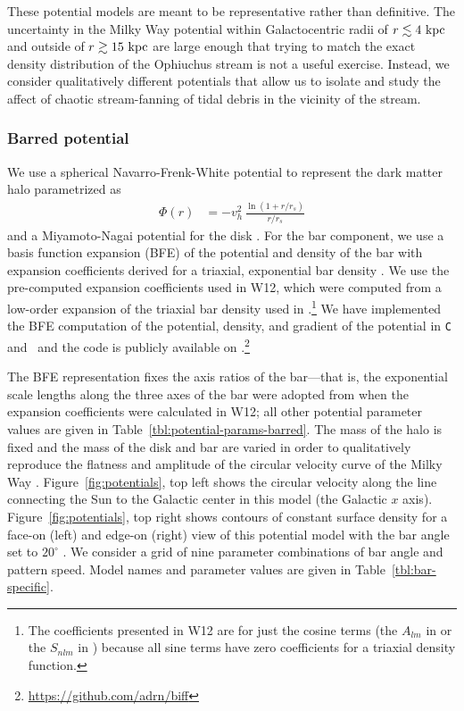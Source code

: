 \documentclass[numberedappendix]{emulateapj}
\begin{document}
These potential models are meant to be representative rather than definitive. The uncertainty in the Milky Way potential within Galactocentric radii of $r\lesssim 4~{\rm kpc}$ and outside of $r\gtrsim 15~{\rm kpc}$ are large enough that trying to match the exact density distribution of the Ophiuchus stream is not a useful exercise. Instead, we consider qualitatively different potentials that allow us to isolate and study the affect of chaotic stream-fanning of tidal debris in the vicinity of the stream. 

\subsubsection{Barred potential}
We use a spherical Navarro-Frenk-White potential to represent the dark matter halo \citep{navarro96} parametrized as
\begin{align}
	\Phi(r) &= -v_h^2\,\frac{\ln{(1 + r/r_s)}}{r/r_s}\label{eq:nfw}
\end{align}
and a Miyamoto-Nagai potential for the disk \citep{miyamoto75}. For the bar component, we use a basis function expansion (BFE) of the potential and density of the bar with expansion coefficients derived for a triaxial, exponential bar density \citep[][hereafter W12]{wang12}. We use the pre-computed expansion coefficients used in W12, which were computed from a low-order expansion of the triaxial bar density used in \citet{dwek95}.\footnote{The coefficients presented in W12 are for just the cosine terms (the $A_{lm}$ in \citet{hernquist92} or the $S_{nlm}$ in \citet{lowing11}) because all sine terms have zero coefficients for a triaxial density function.} We have implemented the BFE computation of the potential, density, and gradient of the potential in \texttt{C} and \python\ and the code is publicly available on \github.\footnote{\url{https://github.com/adrn/biff}} 

The BFE representation fixes the axis ratios of the bar---that is, the exponential scale lengths along the three axes of the bar were adopted from \cite{dwek95} when the expansion coefficients were calculated in W12; all other potential parameter values are given in Table~\ref{tbl:potential-params-barred}. The mass of the halo is fixed and the mass of the disk and bar are varied in order to qualitatively reproduce the flatness and amplitude of the circular velocity curve of the Milky Way \citep{bovy12}. Figure~\ref{fig:potentials}, top left shows the circular velocity along the line connecting the Sun to the Galactic center in this model (the Galactic $x$ axis). Figure~\ref{fig:potentials}, top right shows contours of constant surface density for a face-on (left) and edge-on (right) view of this potential model with the bar angle set to $20^\circ$ \citep[compare to, e.g., Figure 3 in][]{portail15}. We consider a grid of nine parameter combinations of bar angle and pattern speed. Model names and parameter values are given in Table~\ref{tbl:bar-specific}.
\end{document}
